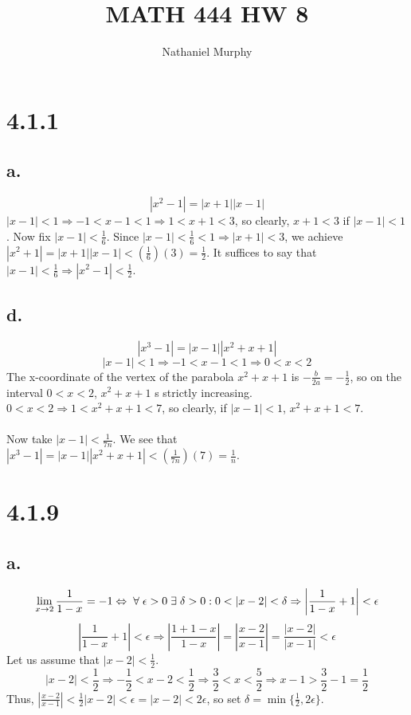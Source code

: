 \documentclass[11pt]{article}
\title{\textbf{MATH 444 HW 8}}
\author{Nathaniel Murphy}
\date{}
\begin{document}
\maketitle

\section*{4.1.1}
\subsection*{a.}
\[|x^2-1|=|x+1||x-1|\]
$|x-1|<1\Rightarrow -1 < x-1 < 1 \Rightarrow 1 < x+1 < 3$, so clearly, $x+1 < 3$ if $|x-1| < 1$. Now fix $|x-1| < \frac{1}{6}$. Since $|x-1| < \frac{1}{6} < 1 \Rightarrow |x+1| < 3$, we achieve $|x^2+1| = |x+1||x-1| < \left(\frac{1}{6}\right)(3) = \frac{1}{2}$. It suffices to say that $|x-1| < \frac{1}{6} \Rightarrow |x^2-1| < \frac{1}{2}$.

\subsection*{d.}
\[|x^3-1| = |x-1||x^2+x+1|\]
\[|x-1| < 1 \Rightarrow -1 < x-1 < 1 \Rightarrow 0 < x < 2\]
The x-coordinate of the vertex of the parabola $x^2+x+1$ is $-\frac{b}{2a}=-\frac{1}{2}$, so on the interval $0<x<2$, $x^2 + x + 1$ s strictly increasing. \\
$0<x<2 \Rightarrow 1 < x^2+x+1 < 7$, so clearly, if $|x-1|<1$, $x^2+x+1<7$. \\
\\
Now take $|x-1| < \frac{1}{7n}$. We see that $|x^3-1|=|x-1||x^2+x+1|< \left(\frac{1}{7n}\right)(7)=\frac{1}{n}$.

\section*{4.1.9}
\subsection*{a.}
\[\lim_{x\to2} \frac{1}{1-x}=-1\Leftrightarrow \hspace{1mm} \forall\hspace{1mm}\epsilon > 0 \hspace{1mm} \exists\hspace{1mm}\delta>0: 0 < |x-2| < \delta \Rightarrow \left|\frac{1}{1-x}+1\right|<\epsilon\]
\[\left|\frac{1}{1-x}+1\right|< \epsilon \Rightarrow \left|\frac{1+1-x}{1-x}\right|=\left|\frac{x-2}{x-1}\right|=\frac{|x-2|}{|x-1|} < \epsilon\]
Let us assume that $|x-2| < \frac{1}{2}$.
\[|x-2| < \frac{1}{2} \Rightarrow -\frac{1}{2} < x-2 < \frac{1}{2} \Rightarrow \frac{3}{2} < x < \frac{5}{2} \Rightarrow x-1 > \frac{3}{2} - 1 = \frac{1}{2}\]
Thus, $\left|\frac{x-2}{x-1}\right| < \frac{1}{2}|x-2|< \epsilon = |x-2| < 2\epsilon$, so set $\delta = \min\{\frac{1}{2},2\epsilon\}$.
\end{document}
